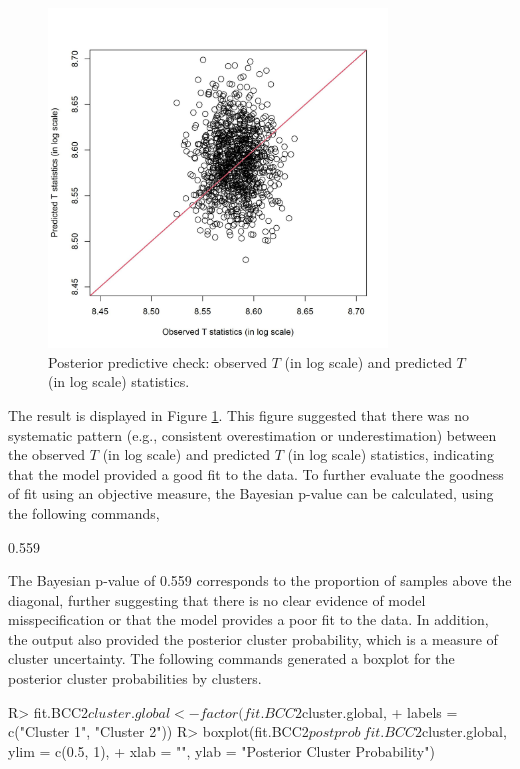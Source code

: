 \begin{figure}[h]
\centering
\includegraphics[width=9cm,height=9cm]{./Figures/posterior_check.JPEG}
\caption{\label{fig:posterior_check}  Posterior predictive check: observed $T$ (in log scale) and predicted $T$ (in log scale) statistics.}
\end{figure}

The result is displayed in Figure \ref{fig:posterior_check}. This figure suggested that there was no systematic pattern (e.g., consistent overestimation or underestimation) between the observed $T$ (in log scale) and predicted $T$ (in log scale) statistics, indicating that the model provided a good fit to the data. To further evaluate the goodness of fit using an objective measure, the Bayesian p-value can be calculated, using the following commands,


\begin{example}
[1] 0.559
\end{example}

The Bayesian p-value of 0.559 corresponds to the proportion of samples above the diagonal, further suggesting that there is no clear evidence of model misspecification or that the model provides a poor fit to the data. In addition, the output also provided the posterior cluster probability, which is a measure of cluster uncertainty. The following commands generated a boxplot for the posterior cluster probabilities by clusters. 

\begin{example}
R> fit.BCC2$cluster.global <- factor(fit.BCC2$cluster.global,
+        labels = c("Cluster 1", "Cluster 2"))
R> boxplot(fit.BCC2$postprob ~ fit.BCC2$cluster.global, ylim = c(0.5, 1),
+        xlab = "", ylab = "Posterior Cluster Probability")
\end{example} 

